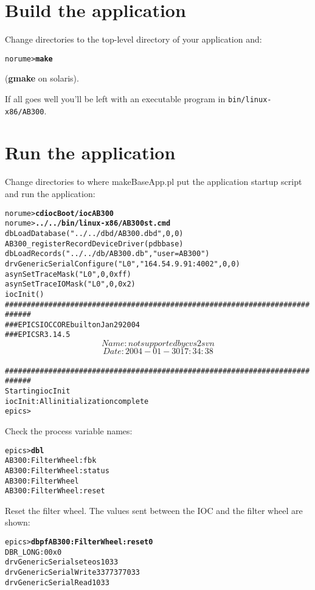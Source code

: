 \documentclass[twoside]{article}
\begin{document}
\section{Build the application}
Change directories to the top-level directory of your application and:
\begin{alltt}
norume> {\bf make}
\end{alltt}
({\bf gmake} on solaris).

If all goes well you'll be left with an executable program in
{\tt bin/linux-x86/AB300}.



\section{Run the application}
Change directories to where makeBaseApp.pl put the application startup script
and run the application:
\begin{alltt}
norume> {\bf cd iocBoot/iocAB300}
norume> {\bf ../../bin/linux-x86/AB300 st.cmd}
dbLoadDatabase("../../dbd/AB300.dbd",0,0)
AB300_registerRecordDeviceDriver(pdbbase) 
dbLoadRecords("../../db/AB300.db","user=AB300")
drvGenericSerialConfigure("L0","164.54.9.91:4002",0,0)
asynSetTraceMask("L0",0,0xff)
asynSetTraceIOMask("L0",0,0x2)
iocInit()
############################################################################
###  EPICS IOC CORE built on Jan 29 2004
###  EPICS R3.14.5 $$Name: not supported by cvs2svn $$ $$Date: 2004-01-30 17:34:38 $$
############################################################################
Starting iocInit
iocInit: All initialization complete
epics>
\end{alltt}

Check the process variable names:
\begin{alltt}
epics> {\bf dbl}
AB300:FilterWheel:fbk
AB300:FilterWheel:status
AB300:FilterWheel
AB300:FilterWheel:reset
\end{alltt}

Reset the filter wheel.  The values sent between the IOC and the filter wheel
are shown:
\begin{alltt}
epics> {\bf dbpf AB300:FilterWheel:reset 0}
DBR_LONG:           0         0x0                 
drvGenericSerial set eos 1 \verb@\@033
drvGenericSerialWrite 3 \verb@\@377\verb@\@377\verb@\@033
drvGenericSerialRead 1 \verb@\@033
\end{alltt}
\end{document}
